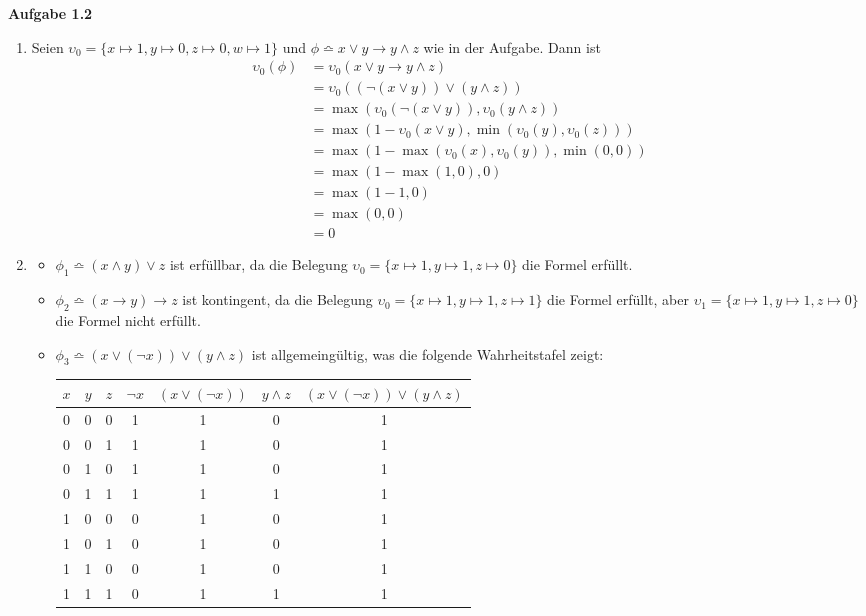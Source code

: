 \documentclass[a4paper,10pt]{article}
\begin{document}
\noindent\textbf{Aufgabe 1.2}\\
\begin{enumerate}
\item Seien $\upsilon_0 = \{x \mapsto 1, y \mapsto 0, z \mapsto 0, w \mapsto 1\}$ und $\phi \bumpeq x \vee y \rightarrow y \wedge z$ wie in der Aufgabe. Dann ist
\begin{align*}
\upsilon_0(\phi) & = \upsilon_0(x \vee y \rightarrow y \wedge z) \\
& = \upsilon_0((\neg(x \vee y)) \vee (y \wedge z)) \\
& = \max(\upsilon_0(\neg(x \vee y)), \upsilon_0(y \wedge z)) \\
& = \max(1 - \upsilon_0(x \vee y), \min(\upsilon_0(y), \upsilon_0(z))) \\
& = \max(1 - \max(\upsilon_0(x), \upsilon_0(y)), \min(0, 0)) \\
& = \max(1 - \max(1, 0), 0) \\
& = \max(1 - 1, 0) \\
& = \max(0, 0) \\
& = 0
\end{align*}

\item 
\begin{itemize}
\item $\phi_1 \bumpeq (x \wedge y) \vee z$ ist erfüllbar, da die Belegung $\upsilon_0 = \{x \mapsto 1, y \mapsto 1, z \mapsto 0\}$ die Formel erfüllt. 
\item $\phi_2 \bumpeq (x \rightarrow y) \rightarrow z$ ist kontingent, da die Belegung $\upsilon_0 = \{x \mapsto 1, y \mapsto 1, z \mapsto 1\}$ die Formel erfüllt, aber $\upsilon_1 = \{x \mapsto 1, y \mapsto 1, z \mapsto 0\}$ die Formel nicht erfüllt.
\item $\phi_3 \bumpeq (x \vee (\neg x)) \vee (y \wedge z)$ ist allgemeingültig, was die folgende Wahrheitstafel zeigt: \\
\begin{tabular}{|c|c|c|c|c|c|c|}
\hline 
\rule[-1ex]{0pt}{2.5ex} $x$ & $y$ & $z$ & $\neg x$ & $(x \vee (\neg x))$ & $y \wedge z$ & $(x \vee (\neg x)) \vee (y \wedge z)$ \\ 
\hline 
\rule[-1ex]{0pt}{2.5ex} 0 & 0 & 0 & 1 & 1 & 0 & 1 \\ 
\hline 
\rule[-1ex]{0pt}{2.5ex} 0 & 0 & 1 & 1 & 1 & 0 & 1 \\ 
\hline 
\rule[-1ex]{0pt}{2.5ex} 0 & 1 & 0 & 1 & 1 & 0 & 1 \\ 
\hline 
\rule[-1ex]{0pt}{2.5ex} 0 & 1 & 1 & 1 & 1 & 1 & 1 \\ 
\hline 
\rule[-1ex]{0pt}{2.5ex} 1 & 0 & 0 & 0 & 1 & 0 & 1 \\ 
\hline 
\rule[-1ex]{0pt}{2.5ex} 1 & 0 & 1 & 0 & 1 & 0 & 1 \\ 
\hline 
\rule[-1ex]{0pt}{2.5ex} 1 & 1 & 0 & 0 & 1 & 0 & 1 \\ 
\hline 
\rule[-1ex]{0pt}{2.5ex} 1 & 1 & 1 & 0 & 1 & 1 & 1 \\ 
\hline 
\end{tabular} 


\end{itemize}
\end{enumerate}
\end{document}
